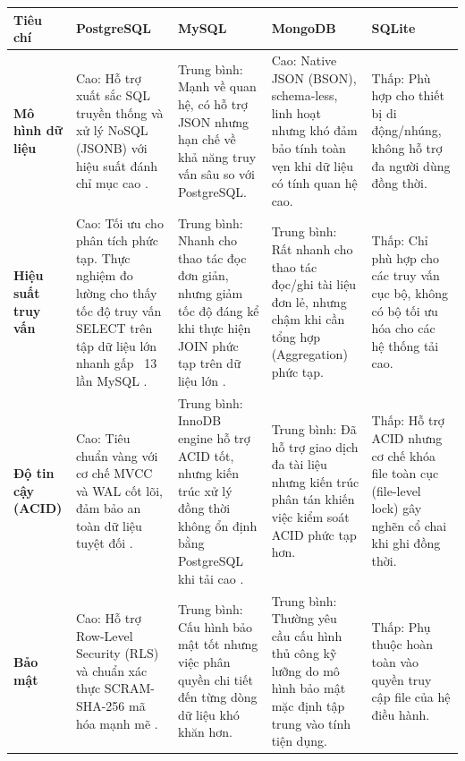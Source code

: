 \clearpage
\begin{landscape}
\begin{table}[h!]
\centering
\setlength{\tabcolsep}{4pt}
\footnotesize
\renewcommand{\arraystretch}{1.4}
\begin{tabularx}{\linewidth}{|l|X|X|X|X|}
\hline
\textbf{Tiêu chí} & \textbf{PostgreSQL} & \textbf{MySQL} & \textbf{MongoDB} & \textbf{SQLite} \\
\hline
\textbf{Mô hình dữ liệu} & 
Cao: Hỗ trợ xuất sắc SQL truyền thống và xử lý NoSQL (JSONB) với hiệu suất đánh chỉ mục cao \cite{schonig2024}. & 
Trung bình: Mạnh về quan hệ, có hỗ trợ JSON nhưng hạn chế về khả năng truy vấn sâu so với PostgreSQL. & 
Cao: Native JSON (BSON), schema-less, linh hoạt nhưng khó đảm bảo tính toàn vẹn khi dữ liệu có tính quan hệ cao. & 
Thấp: Phù hợp cho thiết bị di động/nhúng, không hỗ trợ đa người dùng đồng thời. \\
\hline
\textbf{Hiệu suất truy vấn} & 
Cao: Tối ưu cho phân tích phức tạp. Thực nghiệm đo lường cho thấy tốc độ truy vấn SELECT trên tập dữ liệu lớn nhanh gấp ~13 lần MySQL \cite{uddin2024_benchmark}. & 
Trung bình: Nhanh cho thao tác đọc đơn giản, nhưng giảm tốc độ đáng kể khi thực hiện JOIN phức tạp trên dữ liệu lớn \cite{uddin2024_benchmark}. & 
Trung bình: Rất nhanh cho thao tác đọc/ghi tài liệu đơn lẻ, nhưng chậm khi cần tổng hợp (Aggregation) phức tạp. & 
Thấp: Chỉ phù hợp cho các truy vấn cục bộ, không có bộ tối ưu hóa cho các hệ thống tải cao. \\
\hline
\textbf{Độ tin cậy (ACID)} & 
Cao: Tiêu chuẩn vàng với cơ chế MVCC và WAL cốt lõi, đảm bảo an toàn dữ liệu tuyệt đối \cite{postgres17_manual}. & 
Trung bình: InnoDB engine hỗ trợ ACID tốt, nhưng kiến trúc xử lý đồng thời không ổn định bằng PostgreSQL khi tải cao \cite{uddin2024_benchmark}. & 
Trung bình: Đã hỗ trợ giao dịch đa tài liệu nhưng kiến trúc phân tán khiến việc kiểm soát ACID phức tạp hơn. & 
Thấp: Hỗ trợ ACID nhưng cơ chế khóa file toàn cục (file-level lock) gây nghẽn cổ chai khi ghi đồng thời. \\
\hline
\textbf{Bảo mật} & 
Cao: Hỗ trợ Row-Level Security (RLS) và chuẩn xác thực SCRAM-SHA-256 mã hóa mạnh mẽ \cite{chan2025_dba}. & 
Trung bình: Cấu hình bảo mật tốt nhưng việc phân quyền chi tiết đến từng dòng dữ liệu khó khăn hơn. & 
Trung bình: Thường yêu cầu cấu hình thủ công kỹ lưỡng do mô hình bảo mật mặc định tập trung vào tính tiện dụng. & 
Thấp: Phụ thuộc hoàn toàn vào quyền truy cập file của hệ điều hành. \\

\end{tabularx}
\end{table}
\end{landscape}
